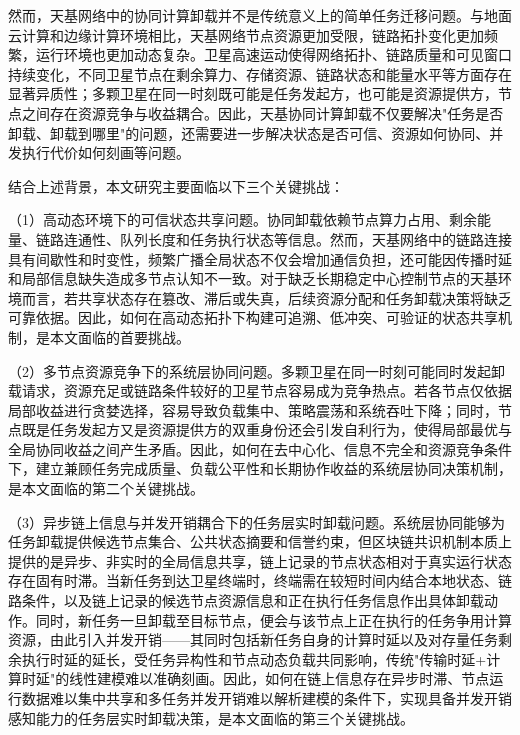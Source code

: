 然而，天基网络中的协同计算卸载并不是传统意义上的简单任务迁移问题。与地面云计算和边缘计算环境相比，天基网络节点资源更加受限，链路拓扑变化更加频繁，运行环境也更加动态复杂。卫星高速运动使得网络拓扑、链路质量和可见窗口持续变化，不同卫星节点在剩余算力、存储资源、链路状态和能量水平等方面存在显著异质性；多颗卫星在同一时刻既可能是任务发起方，也可能是资源提供方，节点之间存在资源竞争与收益耦合。因此，天基协同计算卸载不仅要解决"任务是否卸载、卸载到哪里"的问题，还需要进一步解决状态是否可信、资源如何协同、并发执行代价如何刻画等问题。

结合上述背景，本文研究主要面临以下三个关键挑战：

（1）高动态环境下的可信状态共享问题。协同卸载依赖节点算力占用、剩余能量、链路连通性、队列长度和任务执行状态等信息。然而，天基网络中的链路连接具有间歇性和时变性，频繁广播全局状态不仅会增加通信负担，还可能因传播时延和局部信息缺失造成多节点认知不一致。对于缺乏长期稳定中心控制节点的天基环境而言，若共享状态存在篡改、滞后或失真，后续资源分配和任务卸载决策将缺乏可靠依据。因此，如何在高动态拓扑下构建可追溯、低冲突、可验证的状态共享机制，是本文面临的首要挑战。

（2）多节点资源竞争下的系统层协同问题。多颗卫星在同一时刻可能同时发起卸载请求，资源充足或链路条件较好的卫星节点容易成为竞争热点。若各节点仅依据局部收益进行贪婪选择，容易导致负载集中、策略震荡和系统吞吐下降；同时，节点既是任务发起方又是资源提供方的双重身份还会引发自利行为，使得局部最优与全局协同收益之间产生矛盾。因此，如何在去中心化、信息不完全和资源竞争条件下，建立兼顾任务完成质量、负载公平性和长期协作收益的系统层协同决策机制，是本文面临的第二个关键挑战。

（3）异步链上信息与并发开销耦合下的任务层实时卸载问题。系统层协同能够为任务卸载提供候选节点集合、公共状态摘要和信誉约束，但区块链共识机制本质上提供的是异步、非实时的全局信息共享，链上记录的节点状态相对于真实运行状态存在固有时滞。当新任务到达卫星终端时，终端需在较短时间内结合本地状态、链路条件，以及链上记录的候选节点资源信息和正在执行任务信息作出具体卸载动作。同时，新任务一旦卸载至目标节点，便会与该节点上正在执行的任务争用计算资源，由此引入并发开销——其同时包括新任务自身的计算时延以及对存量任务剩余执行时延的延长，受任务异构性和节点动态负载共同影响，传统"传输时延+计算时延"的线性建模难以准确刻画。因此，如何在链上信息存在异步时滞、节点运行数据难以集中共享和多任务并发开销难以解析建模的条件下，实现具备并发开销感知能力的任务层实时卸载决策，是本文面临的第三个关键挑战。

